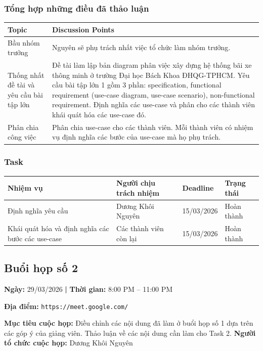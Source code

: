 \subsubsection*{Tổng hợp những điều đã thảo luận}

\begin{longtable}{|p{4cm}|p{10cm}|}
\hline
\textbf{Topic} & \textbf{Discussion Points} \\
\hline
Bầu nhóm trưởng & Nguyên sẽ phụ trách nhất việc tổ chức làm nhóm trưởng. \\
\hline
Thống nhất đề tài và yêu cầu bài tập lớn & Đề tài làm lập bản diagram phân việc xây dựng hệ thống bãi xe thông minh ở trường Đại học Bách Khoa ĐHQG-TPHCM. Yêu cầu bài tập lớn 1 gồm 3 phần: specification, functional requirement (use-case diagram, use-case scenario), non-functional requirement. Định nghĩa các use-case và phân cho các thành viên khái quát hóa các use-case đó.\\
\hline
Phân chia công việc & Phân chia use-case cho các thành viên. Mỗi thành viên có nhiệm vụ định nghĩa các bước của use-case mà họ phụ trách. \\
\hline
\end{longtable}

\subsubsection*{Task}

\begin{longtable}{|p{5cm}|p{6cm}|p{2.5cm}|p{2.5cm}|}
\hline
\textbf{Nhiệm vụ} & \textbf{Người chịu trách nhiệm} & \textbf{Deadline} & \textbf{Trạng thái} \\
\hline
Định nghĩa yêu cầu & Dương Khôi Nguyên & 15/03/2026 & Hoàn thành \\
\hline
Khái quát hóa và định nghĩa các bước các use-case & Các thành viên còn lại & 15/03/2026 & Hoàn thành \\
\hline
\end{longtable}

\subsection*{Buổi họp số 2}

\textbf{Ngày:} 29/03/2026 \textbf{|} \textbf{Thời gian:} 8:00 PM -- 11:00 PM 

\textbf{Địa điểm:} \texttt{https://meet.google.com/} 

\textbf{Mục tiêu cuộc họp:}
Điều chỉnh các nội dung đã làm ở buổi họp số 1 dựa trên các góp ý của giảng viên. Thảo luận về các nội dung cần làm cho Task 2.
\textbf{Người tổ chức cuộc họp:} Dương Khôi Nguyên


